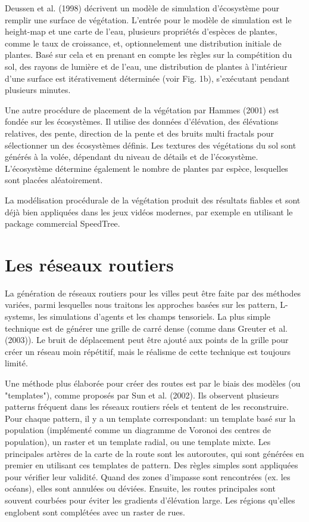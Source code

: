 \documentclass[11pt]{report}
\begin{document}
Deussen et al. (1998) décrivent un  modèle de simulation d'écosystème pour remplir une surface de végétation. L'entrée pour le modèle de simulation est le height-map et une carte de l'eau, plusieurs propriétés d'espèces de plantes, comme le taux de croissance, et, optionnelement une distribution initiale de plantes. Basé sur cela et en prenant en compte  les règles sur la compétition du sol, des rayons de lumière et de l'eau, une distribution de plantes à l'intérieur d'une surface est itérativement déterminée (voir Fig. 1b), s'exécutant pendant plusieurs minutes. \newline

Une autre procédure de placement de la végétation par Hammes (2001) est fondée sur les écosystèmes. Il utilise des données d'élévation, des élévations relatives, des pente, direction de la pente et des bruits multi fractals pour sélectionner un des écosystèmes définis. Les textures des végétations du sol sont générés à la volée, dépendant du niveau de détails et de l'écosystème. L'écosystème détermine également le nombre de plantes par espèce, lesquelles sont placées aléatoirement. \newline

La modélisation procédurale de la végétation produit des résultats fiables et sont déjà bien appliquées dans les jeux vidéos modernes, par exemple en utilisant le package commercial SpeedTree.

\section{Les réseaux routiers}

La génération de réseaux routiers pour les villes peut être faite par des méthodes variées, parmi lesquelles nous traitons les approches basées sur les pattern, L-systems, les simulations d'agents et les champs tensoriels. La plus simple technique est de générer une grille de carré dense (comme dans Greuter et al. (2003)). Le bruit de déplacement peut être ajouté aux points de la grille pour créer un réseau moin répétitif, mais le réalisme de cette technique est toujours limité. \newline

Une méthode plus élaborée pour créer des routes est par le biais des modèles (ou "templates"), comme proposés par Sun et al. (2002). Ils observent plusieurs patterns fréquent dans les réseaux routiers réels et tentent de les reconstruire. Pour chaque pattern, il y a un template correspondant: un template basé sur la population (implémenté comme un diagramme de Voronoi des centres de population), un raster et un template radial, ou une template mixte. Les principales artères de la carte de la route sont les autoroutes, qui sont générées en premier en utilisant ces templates de pattern. Des règles simples sont appliquées pour vérifier leur validité. Quand des zones d'impasse sont rencontrées (ex. les océans), elles sont annulées ou déviées. Ensuite, les routes principales sont souvent courbées pour éviter les gradients d'élévation large. Les régions qu'elles englobent sont complétées avec un raster de rues. \newline
\end{document}

